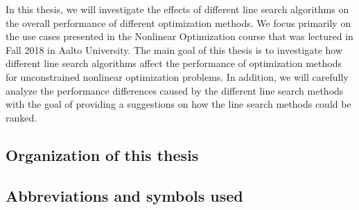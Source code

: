 \documentclass[a4paper,english,titlepage,12pt]{article}
\begin{document}
In this thesis, we will investigate the effects of different line search algorithms on the overall performance of different optimization methods.
We focus primarily on the use cases presented in the Nonlinear Optimization course that was lectured in Fall 2018 in Aalto University.
The main goal of this thesis is to investigate  how different line search algorithms affect the performance of optimization methods for unconstrained nonlinear optimization problems.
In addition, we will carefully analyze the performance differences caused by the different line search methods with the goal of providing a suggestions on how the line search methods could be ranked.

\subsection{Organization of this thesis}

\subsection*{Abbreviations and symbols used}
\end{document}
